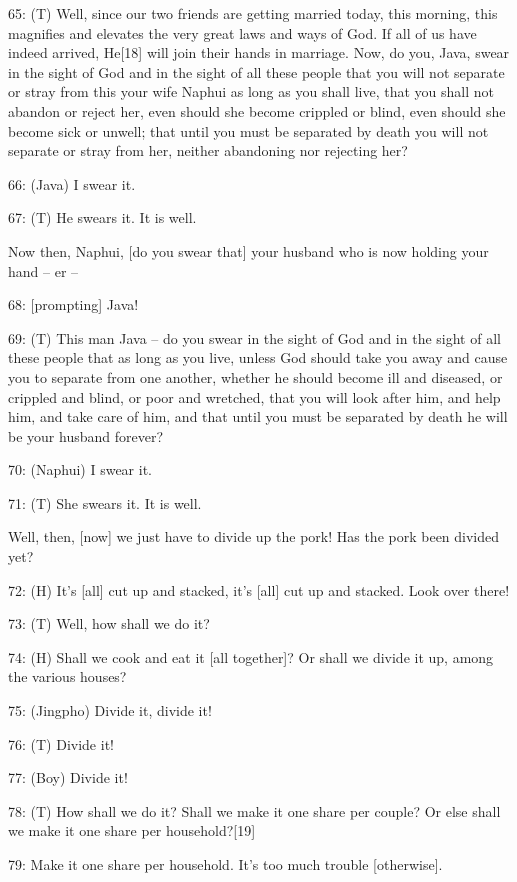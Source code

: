 \leftskip=0pt
{65: (T) Well, since our two friends are getting married today, this morning,
this magnifies and elevates the very great laws and ways of God. If all of us have
indeed arrived, He[18] will join their hands in marriage. Now, do you, Java, swear
in the sight of God and in the sight of all these people that you will not separate
or stray from this your wife Naphui as long as you shall live, that you shall not
abandon or reject her, even should she become crippled or blind, even should she
become sick or unwell; that until you must be separated by death you will not separate
or stray from her, neither abandoning nor rejecting her?}

{66: (Java) I swear it. }

{67: (T) He swears it. It is well. }

{Now then, Naphui, [do you swear that] your husband who is now holding your
hand -- er --}

{68: [prompting] Java!}

{69: (T) This man Java -- do you swear in the sight of God and in the sight
of all these people that as long as you live, unless God should take you away and
cause you to separate from one another, whether he should become ill and diseased,
or crippled and blind, or poor and wretched, that you will look after him, and
help him, and take care of him, and that until you must be separated by death he
will be your husband forever? }

{70: (Naphui) I swear it.}

{71: (T) She swears it. It is well. }

{Well, then, [now] we just have to divide up the pork! Has the pork been
divided yet?}

{72: (H) It's [all] cut up and stacked, it's [all] cut up and stacked. Look
over there!}

{73: (T) Well, how shall we do it?}

{74: (H) Shall we cook and eat it [all together]? Or shall we divide it
up, among the various houses?}

{75: (Jingpho) Divide it, divide it!}

{76: (T) Divide it! }

{77: (Boy) Divide it!}

{78: (T) How shall we do it? Shall we make it one share per couple? Or else
shall we make it one share per household?[19]}

{79: Make it one share per household. It's too much trouble [otherwise].
}

